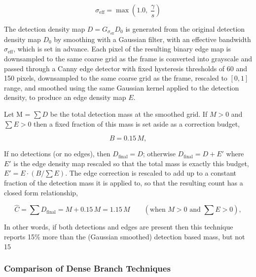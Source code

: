 \begin{equation}
	\sigma_{\text{eff}} = \max\!\left(1.0,\; \frac{\gamma}{s}\right)
\end{equation}

The detection density map $D = G_{\sigma_{\text{eff}}}  D_0$ is generated from the original detection density map $D_0$ by smoothing with a Gaussian filter, with an effective bandwidth $\sigma_{\text{eff}}$, which is set in advance. Each pixel of the resulting binary edge map is downsampled to the same coarse grid as the frame is converted into grayscale and passed through a Canny edge detector with fixed hysteresis thresholds of 60 and 150 pixels, downsampled to the same coarse grid as the frame, rescaled to $[0,1]$ range, and smoothed using the same Gaussian kernel applied to the detection density, to produce an edge density map $E$.

Let M = $\sum D$ be the total detection mass at the smoothed grid. If $M>0$ and $\sum E>0$ then a fixed fraction of this mass is set aside as a correction budget,

\begin{equation}
	B = 0.15\,M,
\end{equation}

If no detections (or no edges), then $D_{\text{final}} = D$; otherwise $D_{\text{final}} = D + E'$ where $E'$ is the edge density map rescaled so that the total mass is exactly this budget, $E' = E \cdot (B/\sum E)$. The edge correction is rescaled to add up to a constant fraction of the detection mass it is applied to, so that the resulting count has a closed form relationship,

\begin{equation}
	\hat C = \sum D_{\text{final}} = M + 0.15\,M = 1.15\,M \qquad (\text{when } M>0 \text{ and } {\textstyle\sum} E>0),
	\label{eq:classical-count}
\end{equation}

In other words, if both detections and edges are present then this technique reports 15\% more than the (Gaussian smoothed) detection based mass, but not 15%

\subsubsection{Comparison of Dense Branch Techniques}
\label{sec:dense-comparison}

